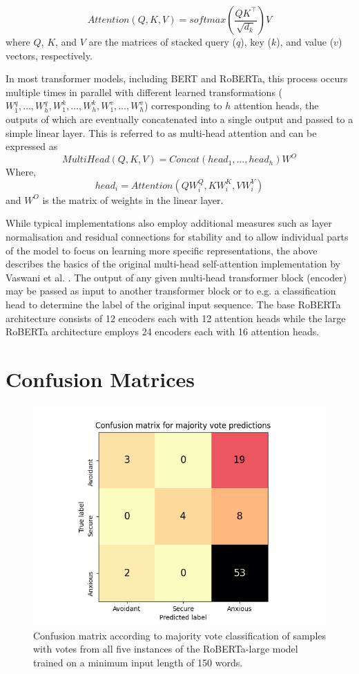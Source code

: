 \documentclass[12pt]{report}
\begin{document}
$$Attention(Q,K,V) = softmax\left(\frac{QK^\intercal}{\sqrt{d_k}}\right)V$$
where $Q$, $K$, and $V$ are the matrices of stacked query ($q$), key ($k$), and value ($v$) vectors, respectively.

In most transformer models, including BERT and RoBERTa, this process occurs multiple times in parallel with different learned transformations ($W_1^q, \ldots, W_h^q, W_1^k, \ldots, W_h^k, W_1^v, \ldots, W_h^v$) corresponding to $h$ attention heads, the outputs of which are eventually concatenated into a single output and passed to a simple linear layer.
This is referred to as multi-head attention and can be expressed as
$$MultiHead(Q, K, V) = Concat(head_1, ..., head_h)W^O$$
Where, $$head_i = Attention(Q W^Q_i, K W^K_i, V W^V_i)$$
and $W^O$ is the matrix of weights in the linear layer.

While typical implementations also employ additional measures such as layer normalisation and residual connections for stability and to allow individual parts of the model to focus on learning more specific representations, the above describes the basics of the original multi-head self-attention implementation by Vaswani et al. \citeyear{Vaswani2017}.
The output of any given multi-head transformer block (encoder) may be passed as input to another transformer block or to e.g. a classification head to determine the label of the original input sequence.
The base RoBERTa architecture consists of 12 encoders each with 12 attention heads while the large RoBERTa architecture employs 24 encoders each with 16 attention heads.

\chapter{Confusion Matrices}
\label{App: confusion matrices}

\begin{figure}
    \includegraphics[width=\textwidth]{figures/roberta-large_150_combined_confusion_matrix.png}
    \caption{Confusion matrix according to majority vote classification of samples with votes from all five instances of the RoBERTa-large model trained on a minimum input length of 150 words.}
    \label{fig: combined confusion matrix}
\end{figure}
\end{document}
